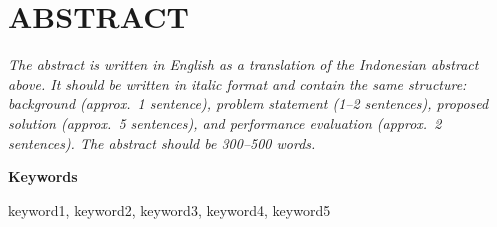 \cleardoublepage
\chapter*{ABSTRACT}
\thispagestyle{fancy}

\textit{The abstract is written in English as a translation of the Indonesian abstract
  above. It should be written in italic format and contain the same structure: background
  (approx.\ 1 sentence), problem statement (1--2 sentences), proposed solution (approx.\
  5 sentences), and performance evaluation (approx.\ 2 sentences). The abstract should be
300--500 words.}

\vspace{0.5cm}
\noindent\textbf{Keywords}

\noindent keyword1, keyword2, keyword3, keyword4, keyword5